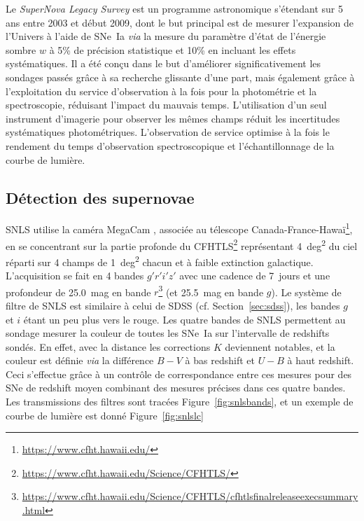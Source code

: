 \documentclass[../main/main.tex]{subfiles}
\begin{document}
Le \textit{SuperNova Legacy Survey} \citep[SNLS,][]{astier2006, sullivan2011}
est un programme astronomique s'étendant sur 5 ans entre 2003 et début 2009,
dont le but principal est de mesurer l'expansion de l'Univers à l'aide de SNe~Ia
\textit{via} la mesure du paramètre d'état de l'énergie sombre $w$ à 5\% de
précision statistique et 10\% en incluant les effets systématiques. Il a été
conçu dans le but d'améliorer significativement les sondages passés grâce à sa
recherche glissante d'une part, mais également grâce à l'exploitation du service
d'observation à la fois pour la photométrie et la spectroscopie, réduisant
l'impact du mauvais temps. L'utilisation d'un seul instrument d'imagerie pour
observer les mêmes champs réduit les incertitudes systématiques photométriques.
L'observation de service optimise à la fois le rendement du temps d'observation
spectroscopique et l'échantillonnage de la courbe de lumière.

\subsection{Détection des supernovae}\label{ssec:snlsdetec}

SNLS utilise la caméra MegaCam \citep{boulade2003}, associée au télescope
Canada-France-Hawaï\footnote{\href{https://www.cfht.hawaii.edu/}
{https://www.cfht.hawaii.edu/}}, en se concentrant sur la partie profonde du
CFHTLS\footnote{\href{https://www.cfht.hawaii.edu/Science/CFHTLS/}
{https://www.cfht.hawaii.edu/Science/CFHTLS/}} représentant \SI{4}{deg^2} du
ciel réparti sur 4 champs de \SI{1}{deg^2} chacun et à faible extinction
galactique. L'acquisition se fait en 4 bandes $g'r'i'z'$ avec une cadence de
\SI{7}{jours} et une profondeur de \SI{25,0}{mag} en bande
$r$\footnote{\href{https://www.cfht.hawaii.edu/Science/CFHTLS/cfhtlsfinalreleaseexecsummary.html}
{https://www.cfht.hawaii.edu/Science/CFHTLS/cfhtlsfinalreleaseexecsummary.html}}
(et \SI{25,5}{mag} en bande $g$). Le système de filtre de SNLS est similaire à
celui de SDSS (cf. Section~\ref{sec:sdss}), les bandes $g$ et $i$ étant un peu
plus vers le rouge. Les quatre bandes de SNLS permettent au sondage mesurer la
couleur de toutes les SNe~Ia sur l'intervalle de redshifts sondés. En effet,
avec la distance les corrections $K$ deviennent notables, et la couleur est
définie \textit{via} la différence $B-V$ à bas redshift et $U-B$ à haut
redshift. Ceci s'effectue grâce à un contrôle de correspondance entre ces
mesures pour des SNe de redshift moyen combinant des mesures précises dans ces
quatre bandes. Les transmissions des filtres sont tracées
Figure~\ref{fig:snlsbands}, et un exemple de courbe de lumière est donné
Figure~\ref{fig:snlslc}
\end{document}
